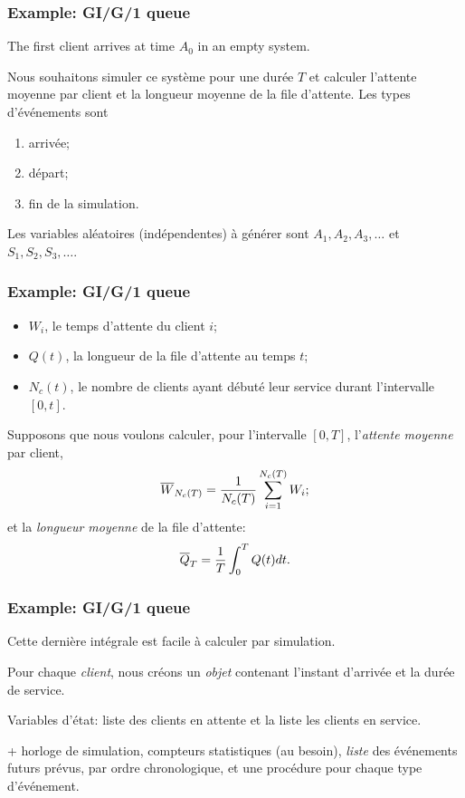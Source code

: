 \documentclass[t,usepdftitle=false]{beamer}
\begin{document}
\begin{frame}
\frametitle{Example: GI/G/1 queue}

The first client arrives at time ${A_0}$ in an empty system.

\mbox{}

Nous souhaitons simuler ce système pour une durée ${T}$ et calculer
l'attente moyenne par client et la longueur moyenne de la file d'attente.
Les types d'événements sont
\begin{enumerate}
\item
arrivée;
\item
départ;
\item
fin de la simulation.
\end{enumerate}
Les variables aléatoires (indépendentes) à générer sont $A_1, A_2,
A_3, \dots$ et $S_1, S_2, S_3, \dots$.

\end{frame}

\begin{frame}
\frametitle{Example: GI/G/1 queue}

\begin{itemize}
\item
${W_i}$, le temps d'attente du client $i$;
\item
${Q(t)}$, la longueur de la file d'attente au temps $t$;
\item
${N_c(t)}$, le nombre de clients ayant débuté leur service durant l'intervalle $[0,t]$.
\end{itemize}
Supposons que nous voulons calculer, pour l'intervalle $[0,T]$,
l'\emph{attente moyenne} par client,
\[
 {\overline{W}_{N_c(T)}} = {1\over N_c(T)} \sum_{i=1}^{N_c(T)} W_i;
\]
et la \emph{longueur moyenne} de la file d'attente:
\[
 {\overline{Q}_T} = {1\over T} \int_0^T Q(t) dt.
\]

\end{frame}

\begin{frame}
\frametitle{Example: GI/G/1 queue}

Cette dernière intégrale est facile à calculer par simulation.

\mbox{}

Pour chaque \emph{client}, nous créons un \emph{objet} contenant l'instant  d'arrivée et la durée de service.

\mbox{}

Variables d'état: liste des clients en attente et la liste les clients en service.

\mbox{}

+ horloge de simulation,
compteurs statistiques (au besoin), \emph{liste} des événements futurs prévus, 
 par ordre chronologique, et une procédure pour chaque type d'événement.
 
\end{frame}
\end{document}
